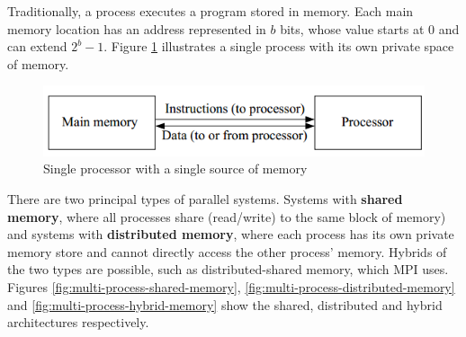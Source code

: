 \documentclass{article}
\begin{document}
Traditionally, a process executes a program stored in memory. Each main memory location has an address represented in $b$ bits, whose value starts at 0 and can extend $2^b - 1$. Figure \ref{fig:single-process-memory} illustrates a single process with its own private space of memory.

\begin{figure}
	\centering
	\includegraphics[scale=0.6]{figures/single-processor-memory.png}
	\caption{Single processor with a single source of memory}
	\label{fig:single-process-memory}
\end{figure}

There are two principal types of parallel systems. Systems with \textbf{shared memory}, where all processes share (read/write) to the same block of memory) and systems with \textbf{distributed memory}, where each process has its own private memory store and cannot directly access the other process' memory. Hybrids of the two types are possible, such as distributed-shared memory, which MPI uses. Figures \ref{fig:multi-process-shared-memory}, \ref{fig:multi-process-distributed-memory} and \ref{fig:multi-process-hybrid-memory}  show the shared, distributed and hybrid architectures respectively.
\end{document}
